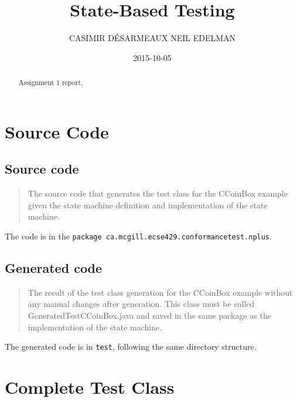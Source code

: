 \documentclass[ieee]{submit}
\title{State-Based Testing}
\date{2015-10-05}
\author{
	\MakeUppercase{Casimir D\'esarmeaux}
	\affil{McGill University (260467441)}
	\MakeUppercase{Neil Edelman}
	\affil{McGill University (110121860)}
}
\begin{document}

\begin{abstract}
Assignment 1 report.
\end{abstract}

\maketitle


\clearpage
{}

\tableofcontents



\clearpage
{}

\section{Source Code}

\subsection{Source code}

\begin{quote}
The source code that generates the test class for the CCoinBox example given the state
machine definition and implementation of the state machine.
\end{quote}

The code is in the {\tt package ca.mcgill.ecse429.conformancetest.nplus}.

\subsection{Generated code}

\begin{quote}
The result of the test class generation for the CCoinBox example without any manual changes
after generation. This class must be called GeneratedTestCCoinBox.java and saved in the same package as the implementation of the state machine.
\end{quote}

The generated code is in {\tt test}, following the same directory structure.

\section{Complete Test Class}
\end{document}
